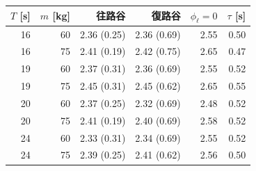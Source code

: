 \begin{tabular}{rrrrrr}
\toprule
$T$ [s] & $m$ [kg] & 往路谷 & 復路谷 & $\phi_\ell=0$ & $\tau$ [s] \\
\midrule
16 & 60 & 2.36 (0.25) & 2.36 (0.69) & 2.55 & 0.50 \\
16 & 75 & 2.41 (0.19) & 2.42 (0.75) & 2.65 & 0.47 \\
19 & 60 & 2.37 (0.31) & 2.36 (0.69) & 2.55 & 0.52 \\
19 & 75 & 2.45 (0.31) & 2.45 (0.62) & 2.65 & 0.55 \\
20 & 60 & 2.37 (0.25) & 2.32 (0.69) & 2.48 & 0.52 \\
20 & 75 & 2.41 (0.19) & 2.40 (0.69) & 2.58 & 0.52 \\
24 & 60 & 2.33 (0.31) & 2.34 (0.69) & 2.55 & 0.52 \\
24 & 75 & 2.39 (0.25) & 2.41 (0.62) & 2.56 & 0.50 \\
\bottomrule
\end{tabular}
